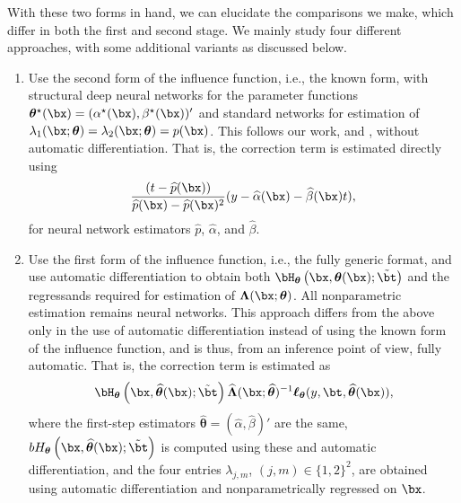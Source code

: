 \documentclass[12pt]{article}
\numberwithin{equation}{section}
\theoremstyle{definition}
\newcommand{\btheta}{\boldsymbol{\theta}}
\newcommand{\bL}{\boldsymbol{\Lambda}}
\newcommand{\bttrue}{\btheta^\star}
\newcommand{\atrue}{\alpha^\star}
\newcommand{\btrue}{\beta^\star}
\newcommand{\btstar}{\tilde{\bt}}
\newcommand{\bthat}{\bm{\widehat{\theta}}}
\newcommand{\ahat}{\widehat{\alpha}}
\newcommand{\bhat}{\widehat{\beta}}
\newcommand{\bLhat}{\widehat{\bL}}
\begin{document}
\begin{appendices}
With these two forms in hand, we can elucidate the comparisons we make, which differ in both the first and second stage. We mainly study four different approaches, with some additional variants as discussed below. 
\begin{enumerate}

    \item Use the second form of the influence function, i.e., the known form, with structural deep neural networks for the parameter functions $\bttrue(\bx) = (\atrue(\bx), \btrue(\bx))'$ and standard networks for estimation of $\lambda_1(\bx; \btheta) = \lambda_2(\bx; \btheta) = p(\bx)$. This follows our work, and \cite{Farrell-Liang-Misra2021_Ecma}, without automatic differentiation. That is, the correction term is estimated directly using
    \[\frac{ ( t - \widehat{p}(\bx) )  }{\widehat{p}(\bx) - \widehat{p}(\bx)^2}  (y - \ahat(\bx) - \bhat(\bx) t ),\]
    for neural network estimators $\widehat{p}$, $\ahat$, and $\bhat$. 

    
    \item Use the first form of the influence function, i.e., the fully generic format, and use automatic differentiation to obtain both $\bH_{\btheta}\left(\bx, \btheta(\bx ); \btstar\right)$ and the regressands required for estimation of $\bL(\bx; \btheta)$. All nonparametric estimation remains neural networks. This approach differs from the above only in the use of automatic differentiation instead of using the known form of the influence function, and is thus, from an inference point of view, fully automatic. That is, the correction term is estimated as
    \[
        \bH_{\btheta}\left(\bx, \bthat(\bx ); \btstar\right) \bLhat(\bx; \bthat)^{-1} \bm{\ell}_{\btheta}(y,\bt, \bthat(\bx)),
    \]
    where the first-step estimators $\bthat = (\ahat, \bhat)'$ are the same, $bH_{\btheta}\left(\bx, \bthat(\bx ); \btstar\right)$ is computed using these and automatic differentiation, and the four entries $\lambda_{j,m}$, $(j,m) \in \{1,2\}^2$, are obtained using automatic differentiation and nonparametrically regressed on $\bx$. 
    

\end{enumerate}
\end{appendices}
\end{document}
